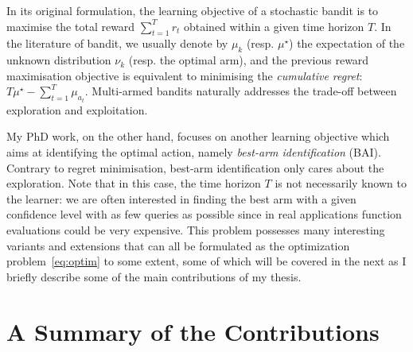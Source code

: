 In its original formulation, the learning objective of a stochastic bandit is to maximise the total reward $\sum_{t=1}^T r_t$ obtained within a given time horizon $T$. In the literature of bandit, we usually denote by $\mu_k$ (resp. $\mu^\star$) the expectation of the unknown distribution $\nu_k$ (resp. the optimal arm), and the previous reward maximisation objective is equivalent to minimising the \emph{cumulative regret}: $T\mu^\star-\sum_{t=1}^T \mu_{a_t}$. %
Multi-armed bandits naturally addresses the trade-off between exploration and exploitation.

My PhD work, on the other hand, focuses on another learning objective which aims at identifying the optimal action, namely \emph{best-arm identification} (BAI). Contrary to regret minimisation, best-arm identification only cares about the exploration. Note that in this case, the time horizon $T$ is not necessarily known to the learner: we are often interested in finding the best arm with a given confidence level with as few queries as possible since in real applications function evaluations could be very expensive. This problem possesses many interesting variants and extensions that can all be formulated as the optimization problem~\eqref{eq:optim} to some extent, some of which will be covered in the next as I briefly describe some of the main contributions of my thesis.
    
    
\section{A Summary of the Contributions}\label{sec:intro.contributions}

